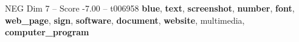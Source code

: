 \begin{textsample}{NEG Dim 7 – Score -7.00 – t006958}  \label{ex:f7_neg_032}
\textbf{blue}, \textbf{text}, \textbf{screenshot}, \textbf{number}, \textbf{font}, \textbf{web\_page}, \textbf{sign}, \textbf{software}, \textbf{document}, \textbf{website}, multimedia, \textbf{computer\_program}

\end{textsample}
